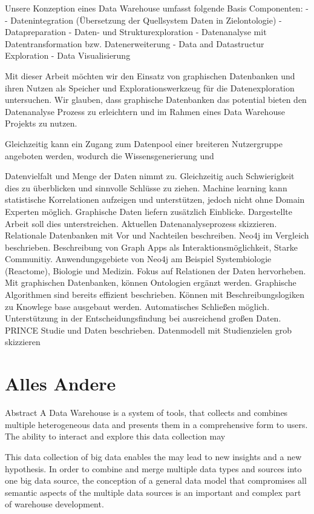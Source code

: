 Unsere Konzeption eines Data Warehouse umfasst folgende Basis Componenten:
- 
- Datenintegration (Übersetzung der Quellsystem Daten in Zielontologie)
- Datapreparation
- Daten- und Strukturexploration
- Datenanalyse mit Datentransformation bzw. Datenerweiterung
- Data and Datastructur Exploration
- Data Visualisierung


Mit dieser Arbeit möchten wir den Einsatz von graphischen Datenbanken und ihren Nutzen als Speicher und Explorationswerkzeug für die Datenexploration untersuchen. Wir glauben, dass graphische Datenbanken das potential bieten den Datenanalyse Prozess zu erleichtern und im Rahmen eines Data Warehouse Projekts zu nutzen.   

Gleichzeitig kann ein Zugang zum Datenpool einer breiteren Nutzergruppe angeboten werden, wodurch die Wissensgenerierung und 


Datenvielfalt und Menge der Daten nimmt zu. Gleichzeitig auch Schwierigkeit dies zu überblicken und sinnvolle Schlüsse zu ziehen. Machine learning kann statistische Korrelationen aufzeigen und unterstützen, jedoch nicht ohne Domain Experten möglich. Graphische Daten liefern zusätzlich Einblicke. Dargestellte Arbeit soll dies unterstreichen.
Aktuellen Datenanalyseprozess skizzieren. Relationale Datenbanken mit Vor\- und Nachteilen beschreiben. Neo4j im Vergleich beschrieben. Beschreibung von Graph Apps als Interaktionsmöglichkeit, Starke Communitiy. Anwendungsgebiete von Neo4j am Beispiel Systembiologie (Reactome), Biologie und Medizin. Fokus auf Relationen der Daten hervorheben. Mit graphischen Datenbanken, können Ontologien ergänzt werden. Graphische Algorithmen sind bereits effizient beschrieben. Können mit Beschreibungslogiken zu Knowlege base ausgebaut werden. Automatisches Schließen möglich.  Unterstützung in der Entscheidungsfindung bei ausreichend großen Daten.
PRINCE Studie und Daten beschrieben. Datenmodell mit Studienzielen grob skizzieren

\chapter{Alles Andere}
Abstract
A Data Warehouse is a system of tools, that collects and combines multiple heterogeneous data and presents them in a comprehensive form to users. The ability to interact and explore this data collection may 



This data collection of big data enables the may lead to new insights and a new hypothesis.  In order to combine and merge multiple data types and sources into one big data source, the conception of a general data model that compromises all semantic aspects of the multiple data sources is an important and complex part of warehouse development. 

